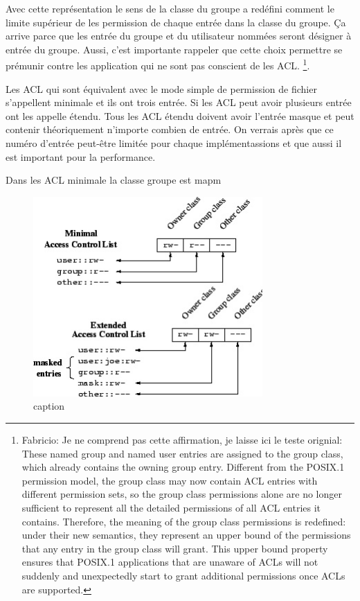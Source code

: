Avec cette représentation le sens de la classe du groupe a redéfini comment le limite supérieur de les permission de chaque entrée dans la classe du groupe. Ça arrive parce que les entrée du groupe et du utilisateur nommées seront désigner à entrée du groupe. Aussi, c'est importante rappeler que cette choix permettre se prémunir contre les application qui ne sont pas conscient de les ACL.
\footnote{Fabricio: Je ne comprend pas cette affirmation, je laisse ici le teste orignial: 
These named group and named user entries are assigned to the group class, which already contains the owning group entry. Different from the POSIX.1 permission model, the group class may now contain ACL entries with different permission sets, so the group class permissions alone are no longer sufficient to represent all the detailed permissions of all ACL entries it contains. Therefore, the meaning of the group class permissions is redefined: under their new semantics, they represent an upper bound of the permissions that any entry in the group class will grant. This upper bound property ensures that POSIX.1 applications that are unaware of ACLs will not suddenly and unexpectedly start to grant additional permissions once ACLs are supported.}.

Les ACL qui sont équivalent avec le mode simple de permission de fichier s'appellent minimale et ils ont trois entrée. Si les ACL peut avoir plusieurs entrée ont les appelle étendu. Tous les ACL étendu doivent avoir l'entrée masque et peut contenir théoriquement n'importe combien de entrée. On verrais après que ce numéro d'entrée peut-être limitée pour chaque implémentassions et que aussi il est important pour la performance.

Dans les ACL minimale la classe groupe est mapm

\begin{figure}[htbp]
	\centering
		\includegraphics[height=3in]{img/acl-mapping.jpg}
	\caption{caption}
	\label{fig:img_acl-mapping}
\end{figure}



